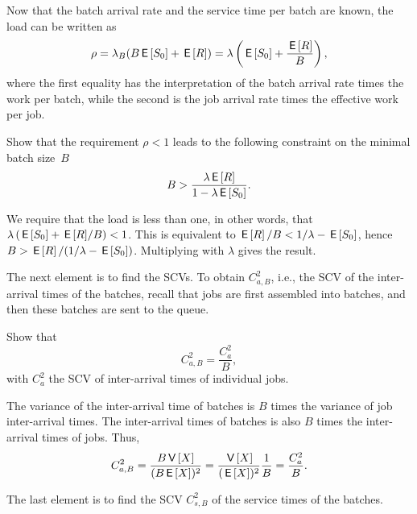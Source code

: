 Now that  the batch arrival rate and the service time per batch are known, the load can be written as
\begin{equation*}
\rho = \lambda_B (B \,\mathsf{E}\left[S_0\right] + \,\mathsf{E}\left[R\right]) = \lambda \left(\,\mathsf{E}\left[S_0\right] + \frac{\,\mathsf{E}\left[R\right]}B\right),
\end{equation*}
where the first equality has the interpretation of the batch arrival rate times the work per batch, while the second is the job arrival rate times the effective work per job. 

\begin{exercise}[\faFlask]
Show that the requirement $\rho < 1$ leads to the following constraint on the minimal batch size~$B$ 
  \begin{equation*}
 B>\frac{\lambda \,\mathsf{E}\left[R\right]}{1-\lambda \,\mathsf{E}\left[S_0\right]}.
  \end{equation*}
  \begin{solution}
    We require that the load is less than one, in other words, that $\lambda\left(\,\mathsf{E}\left[S_0\right] + {\,\mathsf{E}\left[R\right]}/B\right) < 1$. This  is equivalent to $\,\mathsf{E}\left[R\right]/B < 1/\lambda - \,\mathsf{E}\left[S_0\right]$, hence $B > \,\mathsf{E}\left[R\right]/(1/\lambda - \,\mathsf{E}\left[S_0\right])$. Multiplying with $\lambda$ gives the result. 
  \end{solution}
\end{exercise}

The next element is to find the SCVs. To obtain $C_{a,B}^2$, i.e., the SCV of the inter-arrival times of the batches, recall that jobs are first assembled into batches, and then these batches are sent to the queue.

\begin{exercise}[\faFlask]
 Show that 
 \begin{equation*}
C_{a,B}^2 = \frac{C_{a}^2}B,
 \end{equation*}
with $C_a^2$ the SCV of inter-arrival times of individual jobs.
  \begin{solution}
The variance of the inter-arrival time of batches is $B$ times the variance of job inter-arrival times. The inter-arrival times of batches is also $B$ times the inter-arrival times of jobs. Thus, 
\begin{equation*}
  C_{a,B}^2 = \frac{B \,\mathsf{V}\left[X\right]}{(B \,\mathsf{E}\left[X\right])^2} = \frac{\,\mathsf{V}\left[X\right]}{(\,\mathsf{E}\left[X\right])^2} \frac 1 B =  \frac{C_a^2}{B}.
\end{equation*}
  \end{solution}
\end{exercise}

The last element is to find the SCV $C_{s,B}^2$ of the service times of the batches.

